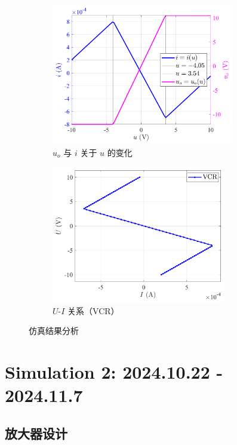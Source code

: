 \documentclass[UTF8]{report}
\theoremstyle{MyLineTheoremStyle} %
\theoremstyle{MyBlockTheoremStyle} %
\theoremstyle{MySubsubsectionStyle} %
\begin{document}
\begin{figure}[H]\centering
\begin{subfigure}[t]{0.52\textwidth}\centering
    \includegraphics[height=175pt]{assets/3/2024-09-13_01-13-08.png}
    \caption{ $u_o$ 与 $i$ 关于 $u$ 的变化}
\end{subfigure}\begin{subfigure}[t]{0.47\textwidth}\centering
    \includegraphics[height=170pt]{assets/3/2024-09-13_01-13-52.png}
    \caption{ $U$-$I$ 关系（VCR）}
\end{subfigure}
\caption{ 仿真结果分析 }\label{仿真结果分析}
\end{figure}



\chapter{Simulation 2: 2024.10.22 - 2024.11.7}
\thispagestyle{fancy}

\section{放大器设计}
\end{document}
